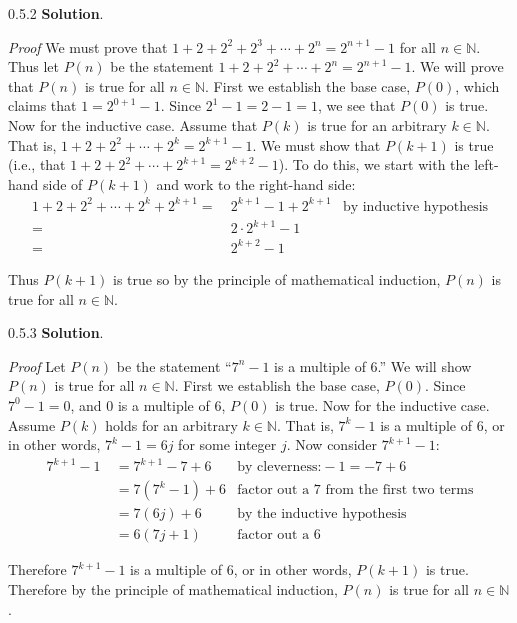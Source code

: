\documentclass[11pt,]{book}
\makeatletter
\theoremstyle{ptxplainnotitle}
\theoremstyle{ptxplaintitle}
\renewcommand*{\proofname}{Proof}
\renewenvironment{proof}[1][\proofname]{\par
  \pushQED{\qed}%
  \normalfont \topsep6\p@\@plus6\p@\relax
  \trivlist
  \item\relax
    {\itshape
    #1\@addpunct{.}}\hspace\labelsep\ignorespaces
}{%
  \popQED\endtrivlist\@endpefalse
}
\theoremstyle{ptxdefinitionnotitle}
\theoremstyle{ptxdefinitiontitle}
\theoremstyle{ptxdefinitionnotitle}
\theoremstyle{ptxdefinitiontitle}
\theoremstyle{ptxdefinitionnotitle}
\theoremstyle{ptxdefinitiontitle}
\theoremstyle{ptxdefinitiontitlenonumber}
\theoremstyle{ptxdefinitiontitlenonumber}
\numberwithin{equation}{chapter}
\newcommand{\N}{\mathbb N}
\newcommand{\amp}{&}
\makeatother
\begin{document}
\begin{divisionexercise}{0.5.2}
\textbf{Solution}.\quad%
\begin{proof}\hypertarget{proof-5}{}
\hypertarget{p-609}{}%
We must prove that \(1 + 2 + 2^2 + 2^3 + \cdots +2^n = 2^{n+1} - 1\) for all \(n \in \N\). Thus let \(P(n)\) be the statement \(1 + 2 + 2^2 + \cdots + 2^n = 2^{n+1} - 1\). We will prove that \(P(n)\) is true for all \(n \in \N\). First we establish the base case, \(P(0)\), which claims that \(1 = 2^{0+1} -1\). Since \(2^1 - 1 = 2 - 1 = 1\), we see that \(P(0)\) is true. Now for the inductive case. Assume that \(P(k)\) is true for an arbitrary \(k \in \N\). That is, \(1 + 2 + 2^2 + \cdots + 2^k = 2^{k+1} - 1\). We must show that \(P(k+1)\) is true (i.e., that \(1 + 2 + 2^2 + \cdots + 2^{k+1} = 2^{k+2} - 1\)). To do this, we start with the left-hand side of \(P(k+1)\) and work to the right-hand side:%
\begin{align*}
1 + 2 + 2^2 + \cdots + 2^k + 2^{k+1} = \amp ~ 2^{k+1} - 1 + 2^{k+1} \amp \text{by inductive hypothesis}\\
= \amp ~2\cdot 2^{k+1} - 1 \amp\\
= \amp ~ 2^{k+2} - 1 \amp
\end{align*}
%
\par
\hypertarget{p-610}{}%
Thus \(P(k+1)\) is true so by the principle of mathematical induction, \(P(n)\) is true for all \(n \in \N\).%
\end{proof}
\end{divisionexercise}%
\begin{divisionexercise}{0.5.3}
\textbf{Solution}.\quad%
\begin{proof}\hypertarget{proof-6}{}
\hypertarget{p-612}{}%
Let \(P(n)\) be the statement ``\(7^n - 1\) is a multiple of 6.'' We will show \(P(n)\) is true for all \(n \in \N\). First we establish the base case, \(P(0)\). Since \(7^0 - 1 = 0\), and \(0\) is a multiple of 6, \(P(0)\) is true. Now for the inductive case. Assume \(P(k)\) holds for an arbitrary \(k \in \N\). That is, \(7^k - 1\) is a multiple of 6, or in other words, \(7^k - 1 = 6j\) for some integer \(j\). Now consider \(7^{k+1} - 1\):%
\begin{align*}
7^{k+1} - 1 ~ \amp = 7^{k+1} - 7 + 6 \amp \text{by cleverness:} -1 = -7 + 6\\
\amp = 7(7^k - 1) + 6 \amp \text{factor out a 7 from the first two terms}\\
\amp = 7(6j) + 6 \amp \text{by the inductive hypothesis}\\
\amp = 6(7j + 1) \amp \text{factor out a 6}
\end{align*}
%
\par
\hypertarget{p-613}{}%
Therefore \(7^{k+1} - 1\) is a multiple of 6, or in other words, \(P(k+1)\) is true. Therefore by the principle of mathematical induction, \(P(n)\) is true for all \(n \in \N\).%
\end{proof}
\end{divisionexercise}%
\end{document}
